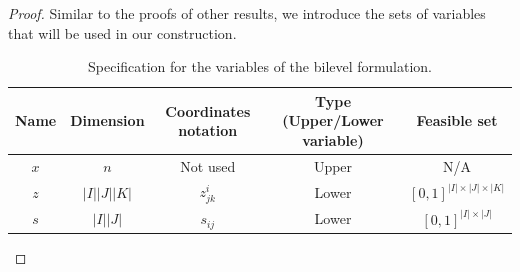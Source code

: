 \documentclass{article}
\theoremstyle{plain}
\theoremstyle{definition}
\begin{document}
\begin{proof}
    Similar to the proofs of other results, we introduce the sets of variables that will be used in our construction. 
    \begin{table}[bhtp]
        \centering
        \begin{tabular}{ccccc}
            \toprule
             Name & Dimension & Coordinates notation & Type (Upper/Lower variable) & Feasible set \\
             \midrule
             $x$ & $n$ & Not used & Upper& N/A\\ 
             \midrule
             $z$ & $|I||J||K|$ & $z_{jk}^i$ & Lower & $[0,1]^{|I| \times |J| \times |K|}$ \\
             \midrule
             $s$ & $|I||J|$ & $s_{ij}$& Lower & $[0,1]^{|I|\times|J|}$\\
             \bottomrule
        \end{tabular}
        \caption{Specification for the variables of the bilevel formulation.}
        \label{tab:variables-lower-compact-semicontinuous-function}
    \end{table}
    

\end{proof}
\end{document}
